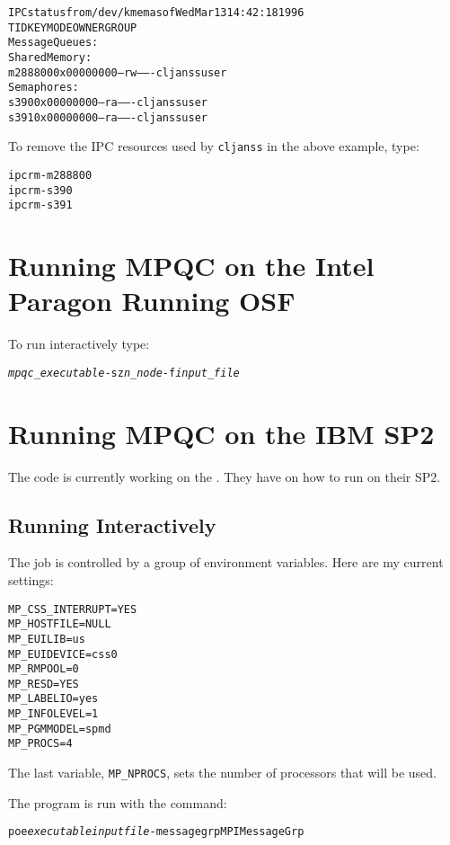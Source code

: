 \begin{alltt}
IPC status from /dev/kmem as of Wed Mar 13 14:42:18 1996
T     ID     KEY        MODE       OWNER    GROUP
Message Queues:
Shared Memory:
m 288800 0x00000000 --rw-------  cljanss     user
Semaphores:
s    390 0x00000000 --ra-------  cljanss     user
s    391 0x00000000 --ra-------  cljanss     user
\end{alltt}

To remove the IPC resources used by \verb|cljanss| in
the above example, type:

\begin{alltt}
ipcrm -m 288800
ipcrm -s 390
ipcrm -s 391
\end{alltt}

\section{Running MPQC on the Intel Paragon Running OSF}

To run interactively type:
\begin{alltt}
{\itshape mpqc_executable} -sz {\itshape n_node} -f {\itshape input_file}
\end{alltt}

\section{Running MPQC on the IBM SP2}

The code is currently working on the
.
They have 
on how to run on their SP2.

\subsection{Running Interactively}

The job is controlled by a group of environment variables.
Here are my current settings:
\begin{verbatim}
MP_CSS_INTERRUPT=YES
MP_HOSTFILE=NULL
MP_EUILIB=us
MP_EUIDEVICE=css0
MP_RMPOOL=0
MP_RESD=YES
MP_LABELIO=yes
MP_INFOLEVEL=1
MP_PGMMODEL=spmd
MP_PROCS=4
\end{verbatim}
The last variable, \verb|MP_NPROCS|, sets the number
of processors that will be used.

The program is run with the command:
\begin{alltt}
poe {\itshape executable} {\itshape inputfile} -messagegrp MPIMessageGrp
\end{alltt}

